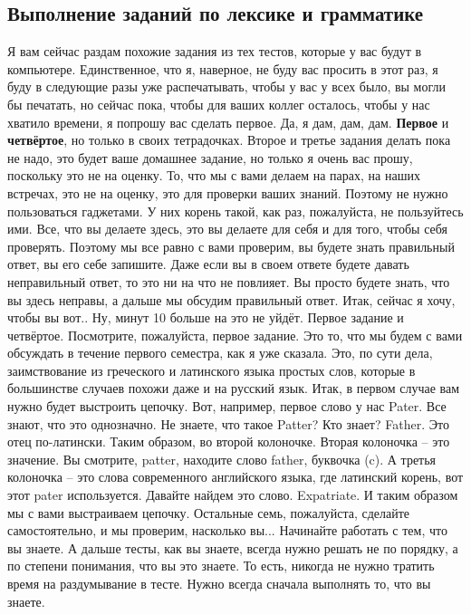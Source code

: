 \documentclass[main.tex]{subfiles}
\begin{document}
\subsection{Выполнение заданий по лексике и грамматике}

Я вам сейчас раздам похожие задания из тех тестов, которые у вас будут в компьютере.
Единственное, что я, наверное, не буду вас просить в этот раз, я буду в следующие разы уже распечатывать, чтобы у вас у всех было, вы могли бы печатать, но сейчас пока, чтобы для ваших коллег осталось, чтобы у нас хватило времени, я попрошу вас сделать первое.
Да, я дам, дам, дам.
\textbf{Первое} и \textbf{четвёртое}, но только в своих тетрадочках.
Второе и третье задания делать пока не надо, это будет ваше домашнее задание, но только я очень вас прошу, поскольку это не на оценку.
То, что мы с вами делаем на парах, на наших встречах, это не на оценку, это для проверки ваших знаний.
Поэтому не нужно пользоваться гаджетами.
У них корень такой, как раз, пожалуйста, не пользуйтесь ими.
Все, что вы делаете здесь, это вы делаете для себя и для того, чтобы себя проверять.
Поэтому мы все равно с вами проверим, вы будете знать правильный ответ, вы его себе запишите.
Даже если вы в своем ответе будете давать неправильный ответ, то это ни на что не повлияет.
Вы просто будете знать, что вы здесь неправы, а дальше мы обсудим правильный ответ.
Итак, сейчас я хочу, чтобы вы вот..
Ну, минут 10 больше на это не уйдёт.
Первое задание и четвёртое.
Посмотрите, пожалуйста, первое задание.
Это то, что мы будем с вами обсуждать в течение первого семестра, как я уже сказала.
Это, по сути дела, заимствование из греческого и латинского языка простых слов, которые в большинстве случаев похожи даже и на русский язык.
Итак, в первом случае вам нужно будет выстроить цепочку.
Вот, например, первое слово у нас Pater.
Все знают, что это однозначно.
Не знаете, что такое Patter? Кто знает? Father.
Это отец по-латински.
Таким образом, во второй колоночке.
Вторая колоночка -- это значение.
Вы смотрите, patter, находите слово father, буквочка (c).
А третья колоночка -- это слова современного английского языка, где латинский корень, вот этот pater используется.
Давайте найдем это слово.
Expatriate.
И таким образом мы с вами выстраиваем цепочку.
Остальные семь, пожалуйста, сделайте самостоятельно, и мы проверим, насколько вы...
Начинайте работать с тем, что вы знаете.
А дальше тесты, как вы знаете, всегда нужно решать не по порядку, а по степени понимания, что вы это знаете.
То есть, никогда не нужно тратить время на раздумывание в тесте.
Нужно всегда сначала выполнять то, что вы знаете.
\\
\end{document}
